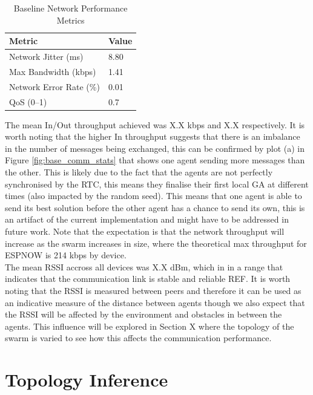 \documentclass[conference]{IEEEtran}
\begin{document}
\begin{table}[h]
  \centering
  \caption{Baseline Network Performance Metrics}
  \label{tab:baseline_network_metrics}
  \begin{tabular}{ll}
  \toprule
  \textbf{Metric} & \textbf{Value} \\
  \midrule
  Network Jitter (ms)      & 8.80  \\
  Max Bandwidth (kbps)     & 1.41  \\
  Network Error Rate (\%)  & 0.01  \\
  QoS (0--1)               & 0.7   \\
  \bottomrule
  \end{tabular}
\end{table}

The mean In/Out throughput achieved was X.X kbps and X.X respectively. It is worth noting that the higher In throughput suggests that there is an imbalance in the number of messages being exchanged, this can be confirmed by plot (a) in Figure \ref{fig:base_comm_stats} that shows one agent sending more messages than the other. This is likely due to the fact that the agents are not perfectly synchronised by the RTC, this means they finalise their first local GA at different times (also impacted by the random seed). This means that one agent is able to send its best solution before the other agent has a chance to send its own, this is an artifact of the current implementation and might have to be addressed in future work. Note that the expectation is that the network throughput will increase as the swarm increases in size, where the theoretical max throughput for ESPNOW is 214 kbps by device.\\ 

The mean RSSI accross all devices was X.X dBm, which in in a range that indicates that the communication link is stable and reliable REF. It is worth noting that the RSSI is measured between peers and therefore it can be used as an indicative measure of the distance between agents though we also expect that the RSSI will be affected by the environment and obstacles in between the agents. This influence will be explored in Section X where the topology of the swarm is varied to see how this affects the communication performance.\\

\section{Topology Inference}
\end{document}
